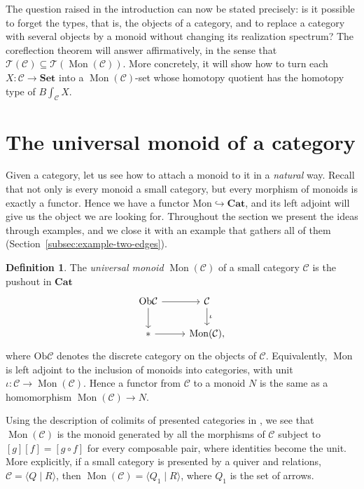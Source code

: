 \documentclass[11pt]{amsart}
\theoremstyle{definition}
\newtheorem{defi}[teo]{Definition}
\theoremstyle{remark}
\numberwithin{figure}{section}%
\newcommand{\CC}{\mathcal{C}}
\DeclareMathOperator{\Mon}{Mon}
\newcommand{\C}{\mathcal{C}}
\newcommand{\T}{\mathcal{T}}
\newcommand{\Ob}{\mathrm{Ob}}
\newcommand{\Set}{\mathbf{Set}}
\newcommand{\Cat}{\mathbf{Cat}}
\begin{document}
The question raised in the introduction can now be stated precisely: is it possible to forget the types, that is, the objects of a category, and to replace a category with several objects by a monoid without changing its realization spectrum? The coreflection theorem will answer affirmatively, in the sense that $\T(\CC)\subseteq\T(\Mon(\CC))$. More concretely, it will show how to turn each $X\colon\CC\to\Set$ into a $\Mon(\CC)$-set whose homotopy quotient has the homotopy type of $B\int_{\CC}X$.



\section{The universal monoid of a category}
\label{sec:universal-monoid}

Given a category, let us see how to attach a monoid to it in a \emph{natural} way. Recall that not only is every monoid a small category, but every morphism of monoids is exactly a functor. Hence we have a functor $\mathrm{Mon}\hookrightarrow\Cat$, and its left adjoint will give us the object we are looking for. Throughout the section we present the ideas through examples, and we close it with an example that gathers all of them (Section~\ref{subsec:example-two-edges}).

\begin{defi}
The \emph{universal monoid} $\Mon(\C)$ of a small category $\C$ is the pushout in $\Cat$
\[
\begin{tikzcd}
\Ob\C \arrow[r] \arrow[d] & \C \arrow[d,"\iota"]\\
{*} \arrow[r] & \Mon(\C),
\end{tikzcd}
\]
where $\Ob\C$ denotes the discrete category on the objects of $\C$. Equivalently, $\Mon$ is left adjoint to the inclusion of monoids into categories, with unit $\iota\colon\C\to\Mon(\C)$. Hence a functor from $\C$ to a monoid $N$ is the same as a homomorphism $\Mon(\C)\to N$.
\end{defi}

Using the description of colimits of presented categories in \cite[\S3.1]{Poly}, we see that $\Mon(\CC)$ is the monoid generated by all the morphisms of $\CC$ subject to $[g][f]=[g\circ f]$ for every composable pair, where identities become the unit. More explicitly, if a small category is presented by a quiver and relations, $\C=\langle Q\mid R\rangle$, then $\Mon(\C)=\langle Q_1\mid R\rangle$, where $Q_1$ is the set of arrows.
\end{document}
